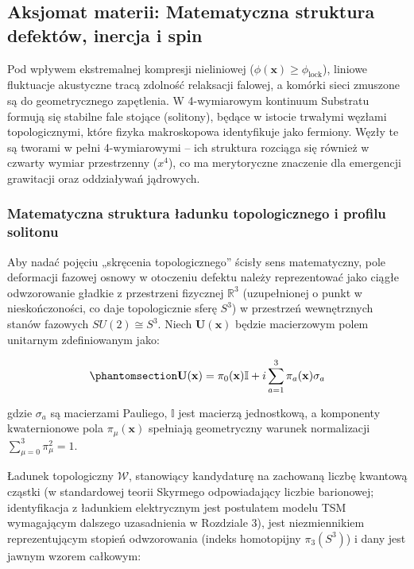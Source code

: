 \documentclass[
  polish,
  letterpaper,
  DIV=11,
  numbers=noendperiod,
  oneside]{scrartcl}
\begin{document}
\subsection{Aksjomat materii: Matematyczna struktura defektów, inercja i
spin}\label{sec-1-6}

Pod wpływem ekstremalnej kompresji nieliniowej
(\(\phi(\mathbf{x}) \ge \phi_{\text{lock}}\)), liniowe fluktuacje
akustyczne tracą zdolność relaksacji falowej, a komórki sieci zmuszone
są do geometrycznego zapętlenia. W 4-wymiarowym kontinuum Substratu
formują się stabilne fale stojące (solitony), będące w istocie trwałymi
węzłami topologicznymi, które fizyka makroskopowa identyfikuje jako
fermiony. Węzły te są tworami w pełni 4-wymiarowymi -- ich struktura
rozciąga się również w czwarty wymiar przestrzenny (\(x^4\)), co ma
merytoryczne znaczenie dla emergencji grawitacji oraz oddziaływań
jądrowych.

\subsubsection{Matematyczna struktura ładunku topologicznego i profilu
solitonu}\label{sec-1-6-1}

Aby nadać pojęciu „skręcenia topologicznego'' ścisły sens matematyczny,
pole deformacji fazowej osnowy w otoczeniu defektu należy reprezentować
jako ciągłe odwzorowanie gładkie z przestrzeni fizycznej
\(\mathbb{R}^3\) (uzupełnionej o punkt w nieskończoności, co daje
topologicznie sferę \(S^3\)) w przestrzeń wewnętrznych stanów fazowych
\(SU(2) \cong S^3\). Niech \(\mathbf{U}(\mathbf{x})\) będzie macierzowym
polem unitarnym zdefiniowanym jako:

\begin{equation}\protect\phantomsection\label{eq-1-6-wz1}{\mathbf{U}(\mathbf{x}) = \pi_0(\mathbf{x})\mathbb{I} + i \sum_{a=1}^3 \pi_a(\mathbf{x})\sigma_a}\end{equation}

gdzie \(\sigma_a\) są macierzami Pauliego, \(\mathbb{I}\) jest macierzą
jednostkową, a komponenty kwaternionowe pola \(\pi_\mu(\mathbf{x})\)
spełniają geometryczny warunek normalizacji
\(\sum_{\mu=0}^3 \pi_\mu^2 = 1\).

Ładunek topologiczny \(\mathcal{W}\), stanowiący kandydaturę na
zachowaną liczbę kwantową cząstki (w standardowej teorii Skyrmego
odpowiadający liczbie barionowej; identyfikacja z ładunkiem elektrycznym
jest postulatem modelu TSM wymagającym dalszego uzasadnienia w Rozdziale
3), jest niezmiennikiem reprezentującym stopień odwzorowania (indeks
homotopijny \(\pi_3(S^3)\)) i dany jest jawnym wzorem całkowym:
\end{document}
